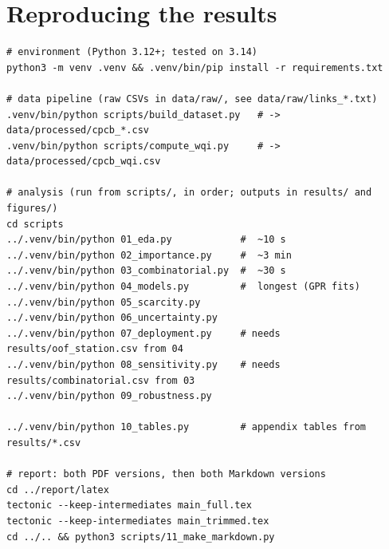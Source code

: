 \section{Reproducing the results}
\label{app:repro}

\begin{small}
\begin{verbatim}
# environment (Python 3.12+; tested on 3.14)
python3 -m venv .venv && .venv/bin/pip install -r requirements.txt

# data pipeline (raw CSVs in data/raw/, see data/raw/links_*.txt)
.venv/bin/python scripts/build_dataset.py   # -> data/processed/cpcb_*.csv
.venv/bin/python scripts/compute_wqi.py     # -> data/processed/cpcb_wqi.csv

# analysis (run from scripts/, in order; outputs in results/ and figures/)
cd scripts
../.venv/bin/python 01_eda.py            #  ~10 s
../.venv/bin/python 02_importance.py     #  ~3 min
../.venv/bin/python 03_combinatorial.py  #  ~30 s
../.venv/bin/python 04_models.py         #  longest (GPR fits)
../.venv/bin/python 05_scarcity.py
../.venv/bin/python 06_uncertainty.py
../.venv/bin/python 07_deployment.py     # needs results/oof_station.csv from 04
../.venv/bin/python 08_sensitivity.py    # needs results/combinatorial.csv from 03
../.venv/bin/python 09_robustness.py

../.venv/bin/python 10_tables.py         # appendix tables from results/*.csv

# report: both PDF versions, then both Markdown versions
cd ../report/latex
tectonic --keep-intermediates main_full.tex
tectonic --keep-intermediates main_trimmed.tex
cd ../.. && python3 scripts/11_make_markdown.py
\end{verbatim}
\end{small}

